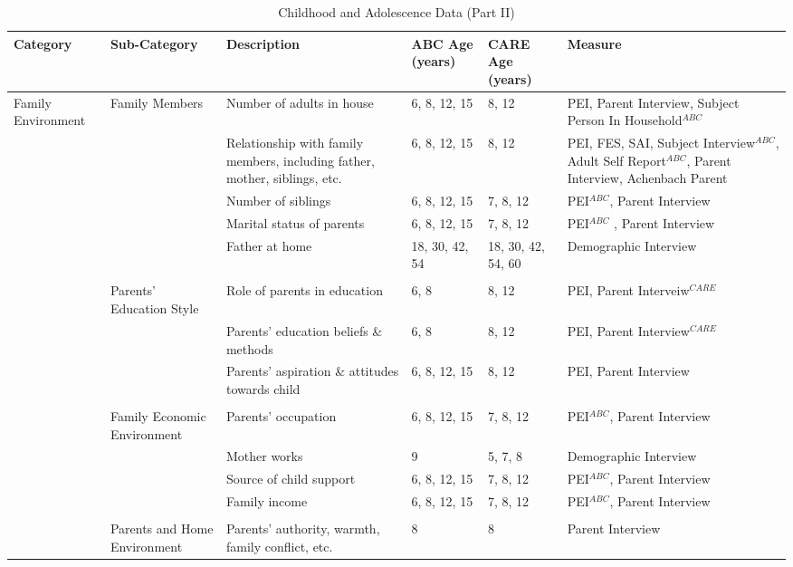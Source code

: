 	
	
\begin{sidewaystable}[H]
\begin{threeparttable}
\small
\caption{Childhood and Adolescence Data (Part II)} \label{tab:youthvars_2}
\centering
\tiny
\begin{tabular}{L{3.5cm} C{3.5cm} C{5cm} C{1.5cm} C{1.5cm} C{6cm}}
\toprule
\textbf{Category}	&	\textbf{Sub-Category}	&	\textbf{Description}	&	\textbf{ABC Age (years)}  	&  \textbf{CARE Age (years)}  & 	\textbf{Measure}	\\ \midrule
Family Environment	&	Family Members	&	Number of adults in house	&	6, 8, 12, 15	&	8, 12	&	PEI, Parent Interview, Subject Person In Household$^{ABC}$		\\
	&		&	Relationship with family members, including father, mother, siblings, etc.	&	6, 8, 12, 15	&	8, 12	&	PEI, FES, SAI, Subject Interview$^{ABC}$, Adult Self Report$^{ABC}$, Parent Interview, Achenbach Parent	\\
	&		&	Number of siblings	&	6, 8, 12, 15	&	7, 8, 12	&	PEI$^{ABC}$, Parent Interview	\\
	&		&	Marital status of parents	&	6, 8, 12, 15	&	7, 8, 12	&	PEI$^{ABC}$	, Parent Interview	\\
		&		& Father at home & 18, 30, 42, 54  & 18, 30, 42, 54, 60 & Demographic Interview \\
	&	\\
	&	Parents' Education Style	&	Role of parents in education	&	6, 8	&	8, 12	&	PEI, Parent Interveiw$^{CARE}$	\\
	&		&	Parents' education beliefs \& methods&	6, 8	&	8, 12 	&	PEI, Parent Interview$^{CARE}$		\\
	&		&	Parents' aspiration \& attitudes towards child	&	6, 8, 12, 15	&	8, 12	&	PEI, Parent Interview	\\
	&	\\
	&	Family Economic Environment	&	Parents' occupation	&	6, 8, 12, 15	&	7, 8, 12	&	PEI$^{ABC}$, Parent Interview	\\
		&							& Mother works & 9 & 5, 7, 8 & Demographic Interview \\
	&		&	Source of child support	&	6, 8, 12, 15	&	7, 8, 12	&	PEI$^{ABC}$, Parent Interview	\\
	&		&	Family income	&	6, 8, 12, 15	&	7, 8, 12	&	PEI$^{ABC}$, Parent Interview	\\
	&	\\
		&	Parents and Home Environment & Parents' authority, warmth, family conflict, etc. & 8 & 8 & Parent Interview \\

\end{tabular}
\end{threeparttable}
\end{sidewaystable}
